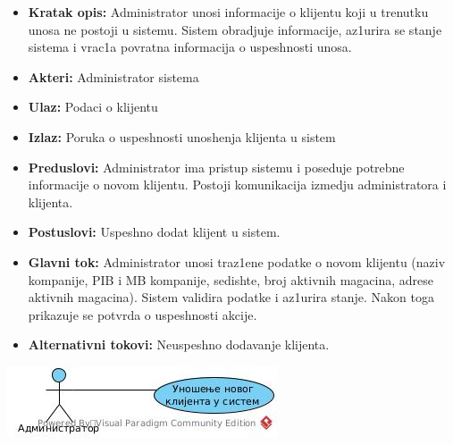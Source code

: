 
\begin{itemize}
\item{\textbf{Kratak opis:} Administrator unosi informacije o klijentu koji u trenutku unosa ne postoji u sistemu. Sistem obradjuje informacije, az1urira se stanje sistema i vrac1a povratna informacija o uspeshnosti unosa.}
\item{\textbf{Akteri:} Administrator sistema}
\item{\textbf{Ulaz:} Podaci o klijentu }
\item{\textbf{Izlaz:} Poruka o uspeshnosti unoshenja klijenta u sistem }
\item{\textbf{Preduslovi:} Administrator ima pristup sistemu i poseduje potrebne informacije o novom klijentu. Postoji komunikacija izmedju administratora i klijenta. }
\item{\textbf{Postuslovi:} Uspeshno dodat klijent u sistem.}
\item{\textbf{Glavni tok:} Administrator unosi traz1ene podatke o novom klijentu (naziv kompanije, PIB i MB kompanije, sedishte, broj aktivnih magacina, adrese aktivnih magacina). Sistem validira podatke i az1urira stanje. Nakon toga prikazuje se potvrda o uspeshnosti akcije. }
\item{\textbf{Alternativni tokovi:} Neuspeshno dodavanje klijenta.}
\end{itemize}
\includegraphics{Slike/SUadministrativniPoslovi.jpg}